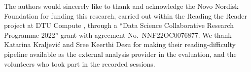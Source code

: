 \documentclass[sigconf,screen]{acmart}
\begin{document}
\begin{acks}
The authors would sincerely like to thank and acknowledge the Novo Nordisk Foundation for funding this research, carried out within the Reading the Reader project at DTU Compute \cite{dtucompute2025rtr, nnf2023rtr}, through a ``Data Science Collaborative Research Programme 2022'' grant with agreement No.~NNF22OC0076877.
We thank Katarina Kraljevi\'{c} and Sree Keerthi Desu for making their reading-difficulty pipeline available as the external analysis provider in the evaluation, and the volunteers who took part in the recorded sessions.
\end{acks}



\end{document}
